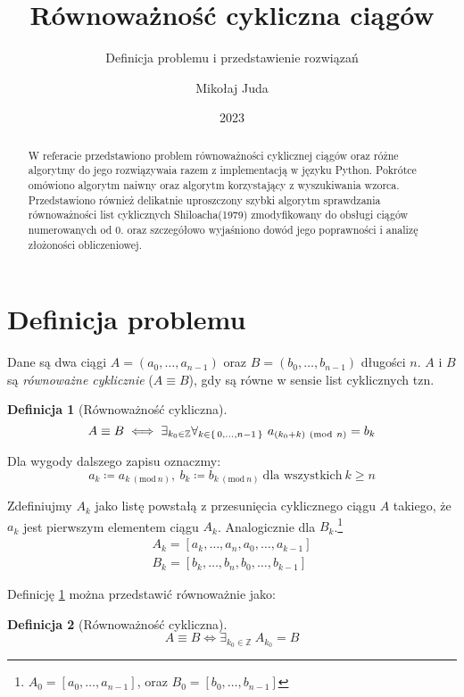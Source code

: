\documentclass{scrartcl}
\title{Równoważność cykliczna ciągów}
\subtitle{Definicja problemu i przedstawienie rozwiązań}
\date{2023}
\author{Mikołaj Juda}
\newcommand{\Mod}[1]{\ (\mathrm{mod}\ #1)}
\theoremstyle{definition}
\newtheorem{cyclic_equivalence_1}{Definicja}[section]
\newtheorem{cyclic_equivalence_2}
[cyclic_equivalence_1]{Definicja}
\theoremstyle{plain}
\theoremstyle{remark}
\theoremstyle{plain}
\theoremstyle{definition}
\theoremstyle{plain}
\begin{document}
\maketitle
\begin{abstract}
	W referacie przedstawiono
	problem równoważności cyklicznej ciągów
	oraz różne algorytmy do jego rozwiązywaia
	razem z implementacją w języku Python.
	Pokrótce omówiono algorytm naiwny
	oraz algorytm korzystający z wyszukiwania wzorca.
	Przedstawiono również delikatnie uproszczony
	szybki algorytm sprawdzania równoważności
	list cyklicznych Shiloacha(1979)\cite{shiloach1979}
	zmodyfikowany do obsługi ciągów
	numerowanych od \(0\)\cite{wazniakmimuw}.
	oraz szczegółowo wyjaśniono dowód jego poprawności
	i analizę złożoności obliczeniowej.
\end{abstract}
\tableofcontents
\pagebreak
\section{Definicja problemu}
Dane są dwa ciągi
\(A=(a_0,\dots,a_{n-1})\) oraz \(B=(b_0,\dots,b_{n-1})\)
długości \(n\).\linebreak
\(A\) i \(B\) są \emph{równoważne cyklicznie}
(\(A\equiv B\)),
gdy są równe w sensie list cyklicznych tzn.
\begin{cyclic_equivalence_1}[Równoważność cykliczna]
	\label{def:cyclic_equivalence_1}
	\[A\equiv B \iff \exists_{k_0\in\mathbb{Z}}
		\forall_{k\in\set{0,\dots,n-1}}\ a_{(k_0+k)\Mod{n}}=b_k\]
\end{cyclic_equivalence_1}

Dla wygody dalszego zapisu oznaczmy:
\[a_k\coloneq a_{k\Mod{n}},\ b_k\coloneq b_{k\Mod{n}}
	\ \text{dla wszystkich}\ k\ge n\]

Zdefiniujmy \(A_k\) jako listę powstałą z przesunięcia cyklicznego
ciągu \(A\) takiego, że \(a_k\) jest
pierwszym elementem ciągu \(A_k\).
Analogicznie dla \(B_k\).\footnote{\(A_0=[a_0,\dots,a_{n-1}]\),
oraz \(B_0=[b_0,\dots,b_{n-1}]\)}
\begin{align*}
	A_k=[a_{k},\dots,a_n,a_0,\dots,a_{k-1}] \\
	B_k=[b_{k},\dots,b_n,b_0,\dots,b_{k-1}]
\end{align*}

Definicję \cref{def:cyclic_equivalence_1} można
przedstawić równoważnie jako:
\begin{cyclic_equivalence_2}[Równoważność cykliczna]
	\[A\equiv B \iff \exists_{k_0\in\mathbb{Z}}
		\ A_{k_0}=B\]
\end{cyclic_equivalence_2}
\end{document}
